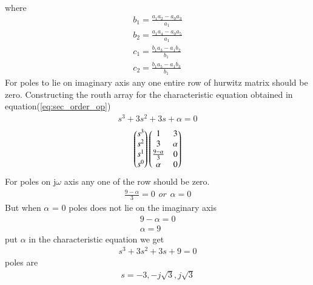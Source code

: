 \begin{enumerate}[label=\thesection.\arabic*.,ref=\thesection.\theenumi]
 \\
 where
 \begin{align}
 b_1 =\frac{ a_1a_2-a_0a_3}{a_1}  
 \\
 b_2 =\frac{ a_1a_4-a_0a_5}{a_1} 
 \\
 c_1=\frac{ b_1a_3-a_1b_2}{b_1} 
\\
 c_2=\frac{ b_1a_5-a_1b_3}{b_1}  
\end{align}
For poles to lie on imaginary axis any one entire row of hurwitz matrix should be zero.
Constructing the routh array for the characteristic equation obtained in equation(\ref{eq:sec_order_op})
\begin{align}
 s^3+3s^2+3s+\alpha = 0
\end{align}
%
\begin{align}
\myvec{s^3\\s^2\\s^1 \\ s^0}
\myvec{1 & 3 \\ 3 & \alpha \\  \frac{9-\alpha}{3} & 0\\ \alpha & 0} \label{eq:sec_order_op_1}
\end{align}
For poles on j$\omega$ axis any one of the row should be zero.
\begin{align}
\frac{9-\alpha}{3} = 0 \hspace{5pt} or\hspace{5pt} \alpha = 0
\end{align}
But when $\alpha$ = 0 poles does not lie on the imaginary axis
\begin{align}
   9-\alpha = 0\\
   \alpha = 9
\end{align}
put $\alpha$ in the characteristic equation we get
\begin{align}
s^3+3s^2+3s+9=0
\end{align}
poles are 
\begin{align}
s = -3,-j\sqrt{3} ,j\sqrt{3}
\end{align}
\end{enumerate}